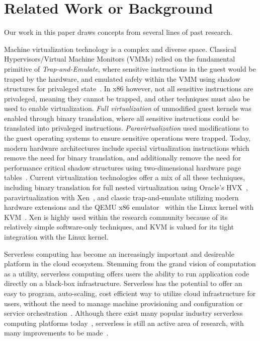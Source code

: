 \section{Related Work or Background} \label{sec:related}
Our work in this paper draws concepts from several lines of past research.

 Machine virtualization technology is
a complex and diverse space. Classical Hypervisors/Virtual Machine Monitors
(VMMs) relied on the fundamental primitive of \emph{Trap-and-Emulate}, where
sensitive instructions in the guest would be traped by the hardware, and
emulated safely within the VMM using shadow structures for privaleged
state~\cite{classic-virt}. In x86 however, not all sensitive instructions are
privaleged, meaning they cannot be trapped, and other techniques must also be used
to enable virtualization. \emph{Full virtualization} of unmodified guest
kernels was enabled through binary translation, where all sensitive
instructions could be translated into privaleged instructions.
\emph{Paravirtualization} used modifications to the guest operating systems to
ensure sensitive operations were trapped. Today, modern hardware architectures
include special virtualization instructions which remove the need for binary
translation, and additionally remove the need for performance critical shadow
structures using two-dimensional hardware page tables~\cite{virt-techniques}.
Current virtualization technologies offer a mix of all these techniques,
including binary translation for full nested virtualization using Oracle's
HVX~\cite{hvx}, paravirtualization with Xen~\cite{xen}, and classic
trap-and-emulate utilizing modern hardware extensions and the QEMU x86
emulator~\cite{qemu} within the Linux kernel with KVM~\cite{kvm}. Xen is highly
used within the research community because of its relatively simple
software-only techniques, and KVM is valued for its tight integration with the
Linux kernel.

 Serverless computing has become an
increasingly important and desireable platform in the cloud ecosystem. Stemming
from the grand vision of computation as a utility, serverless computing offers
users the ability to run application code directly on a black-box
infrastructure. Serverless has the potential to offer an easy to program,
auto-scaling, cost efficient way to utilize cloud infrastructure for users,
without the need to manage machine provisioning and configuration or service
orchestration~\cite{berkeley-serverless}. Although there exist many popular
industry serverless computing platforms
today~\cite{lambda}\cite{gcf}\cite{azure-cf}\cite{openwhisk}, serverless is
still an active area of research, with many improvements to be
made~\cite{peeking}\cite{trilemma}\cite{steps-back}.

